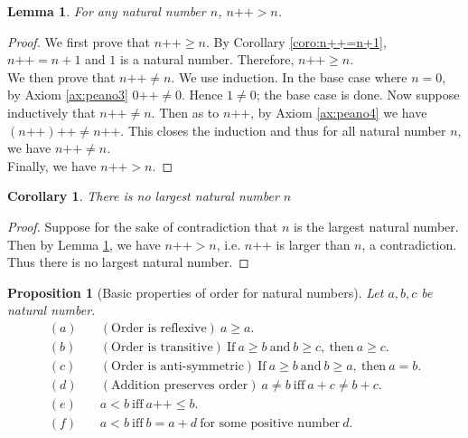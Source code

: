 \documentclass[a4paper]{book}
\newtheorem*{proof}{\textit{Proof.}}
\theoremstyle{break}
\newtheorem{corollary}{Corollary}[section]
\newtheorem{lemma}{Lemma}[section]
\newtheorem{proposition}{Proposition}[section]
\begin{document}
			\begin{lemma}
				\label{lem:n++>n}
				For any natural number $n$, $n\texttt{++}>n$.
			\end{lemma}
			\begin{proof}
				We first prove that $n\texttt{++} \geq n$. By Corollary \ref{coro:n++=n+1}, $n\texttt{++}=n+1$ and $1$ is a natural number. Therefore, $n\texttt{++} \geq n$.\\
				We then prove that $n\texttt{++}\neq n$. We use induction. In the base case where $n=0$, by Axiom \ref{ax:peano3} $0\texttt{++} \neq 0$. Hence $1 \neq 0$; the base case is done. Now suppose inductively that $n\texttt{++}\neq n$. Then as to $n\texttt{++}$, by Axiom \ref{ax:peano4} we have $(n\texttt{++})\texttt{++}\neq n\texttt{++}$. This closes the induction and thus for all natural number $n$, we have $n\texttt{++}\neq n$.\\
				Finally, we have $n\texttt{++}>n$.
			\end{proof}
			\begin{corollary}
				There is no largest natural number $n$
			\end{corollary}
			\begin{proof}
				Suppose for the sake of contradiction that $n$ is the largest natural number. Then by Lemma \ref{lem:n++>n}, we have $n\texttt{++}>n$, i.e. $n\texttt{++}$ is larger than $n$, a contradiction. Thus there is no largest natural number.
			\end{proof}
			\begin{proposition}[Basic properties of order for natural numbers]
				\label{pro:NaturalNumberOrder}
				Let $a,b,c$ be natural number.
				\begin{align*}
					(a) &\quad(\textrm{Order is reflexive})~a \geq a.\\
					(b) &\quad(\textrm{Order is transitive})~\textrm{If}~a \geq b ~\textrm{and}~b \geq c,~\mathrm{then}~a \geq c.\\
					(c) &\quad(\textrm{Order is anti-symmetric})~\textrm{If}~a \geq b~\textrm{and}~b \geq a,~\textrm{then}~a=b.\\
					(d) &\quad(\textrm{Addition preserves order})~a \neq b ~\textrm{iff}~a+c \neq b+c.\\
					(e) &\quad a<b~\textrm{iff}~a\texttt{++}\leq b.\\
					(f) &\quad a<b~\textrm{iff}~b=a+d~\textrm{for some positive number}~d.
				\end{align*}
			\end{proposition}
\end{document}
